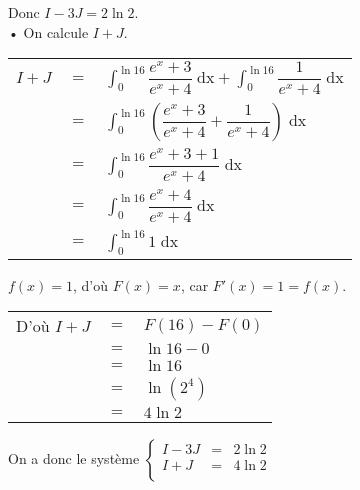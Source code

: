 \vspace*{.3cm}

Donc $I - 3J = 2\ln2$. \\

• On calcule $I + J$. \\

\begin{tabular}{lll}
$I + J$ & $=$ & $\displaystyle \int_0^{\ln 16} \dfrac{e^x + 3}{e^x + 4} \; \mathrm{dx} + \displaystyle \int_0^{\ln 16} \dfrac{1}{e^x + 4} \; \mathrm{dx}$ \vspace*{.3cm} \\
& $=$ & $\displaystyle \int_0^{\ln 16} \left(\dfrac{e^x + 3}{e^x + 4} + \dfrac{1}{e^x + 4}\right) \; \mathrm{dx} $ \vspace*{.3cm} \\
& $=$ & $\displaystyle \int_0^{\ln 16} \dfrac{e^x + 3 + 1}{e^x + 4} \; \mathrm{dx}$ \vspace*{.3cm} \\
& $=$ & $\displaystyle \int_0^{\ln 16} \dfrac{e^x + 4}{e^x + 4} \; \mathrm{dx}$ \vspace*{.3cm} \\
& $=$ & $\displaystyle \int_0^{\ln 16} 1 \; \mathrm{dx}$ \\
\end{tabular}

\vspace*{.3cm}

$f(x) = 1$, d'où $F(x) = x$, car $F'(x) = 1 = f(x)$. \\

\begin{tabular}{lll}
D'où $I + J$ & $=$ & $F\left(16\right) - F\left(0\right)$ \\
& $=$ & $\ln 16 - 0$ \\
& $=$ & $\ln 16$ \\
& $=$ & $\ln\left(2^4\right)$ \\
& $=$ & $4\ln 2$ \\
\end{tabular}

\vspace*{.3cm}

On a donc le système $\left\{
  \begin{array}{rll}
    I-3J & = & 2\ln 2 \\
    I+J & = & 4\ln 2 \\
  \end{array}
\right.$

\vspace*{.3cm} 

